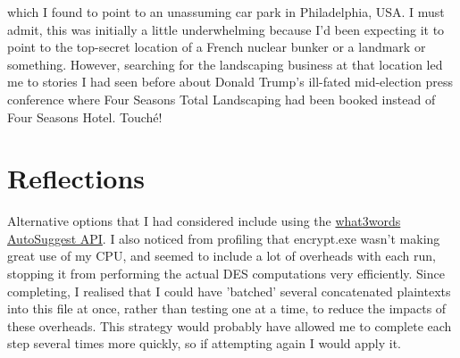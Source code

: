 \documentclass[11pt]{article} %
\begin{document}
which I found to point to an unassuming car park in Philadelphia, USA. I must admit, this was initially a little underwhelming because I'd been expecting it to point to the top-secret location of a French nuclear bunker or a landmark or something. However, searching for the landscaping business at that location led me to stories I had seen before about Donald Trump's ill-fated mid-election press conference where Four Seasons Total Landscaping had been booked instead of Four Seasons Hotel. Touché!

\section{Reflections}

Alternative options that I had considered include using the \href{https://developer.what3words.com/tutorial/python}{what3words AutoSuggest API}. I also noticed from profiling that encrypt.exe wasn't making great use of my CPU, and seemed to include a lot of overheads with each run, stopping it from performing the actual DES computations very efficiently. Since completing, I realised that I could have 'batched' several concatenated plaintexts into this file at once, rather than testing one at a time, to reduce the impacts of these overheads. This strategy would probably have allowed me to complete each step several times more quickly, so if attempting again I would apply it.
\end{document}
